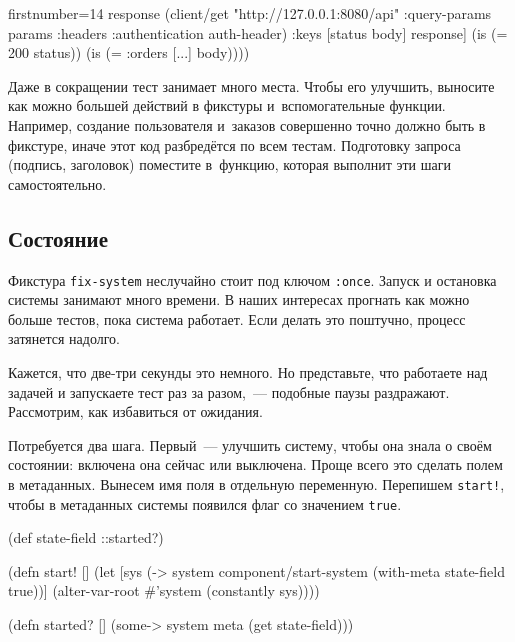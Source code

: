 \else

\begin{english}
  \begin{clojure/lines*}{firstnumber=14}
        response
        (client/get "http://127.0.0.1:8080/api"
            {:query-params params
             :headers {:authentication auth-header}})
        {:keys [status body]} response]
    (is (= 200 status))
    (is (= {:orders [...]} body))))
  \end{clojure/lines*}
\end{english}

\fi

Даже в сокращении тест занимает много места. Чтобы его улучшить, выносите как
можно большей действий в фикстуры и~вспомогательные функции. Например, создание
пользователя и~заказов совершенно точно должно быть в фикстуре, иначе этот код
разбредётся по всем тестам. Подготовку запроса (подпись, заголовок) поместите
в~функцию, которая выполнит эти шаги самостоятельно.

\subsection{Состояние}

Фикстура \verb|fix-system| неслучайно стоит под ключом \verb|:once|. Запуск и
остановка системы занимают много времени. В наших интересах прогнать как можно
больше тестов, пока система работает. Если делать это поштучно, процесс
затянется надолго.

Кажется, что две-три секунды это немного. Но представьте, что работаете над
задачей и запускаете тест раз за разом,~--- подобные паузы
раздражают. Рассмотрим, как избавиться от ожидания.


Потребуется два шага. Первый~--- улучшить систему, чтобы она знала о своём
состоянии: включена она сейчас или выключена. Проще всего это сделать полем в
метаданных. Вынесем имя поля в отдельную переменную. Перепишем \verb|start!|,
чтобы в метаданных системы появился флаг со значением \verb|true|.

\ifnarrow

\begin{english}
  \begin{clojure}
(def state-field ::started?)

(defn start! []
  (let [sys
        (-> system
            component/start-system
            (with-meta
              {state-field true}))]
    (alter-var-root
      #'system (constantly sys))))

(defn started? []
  (some-> system meta (get state-field)))
  \end{clojure}
\end{english}

